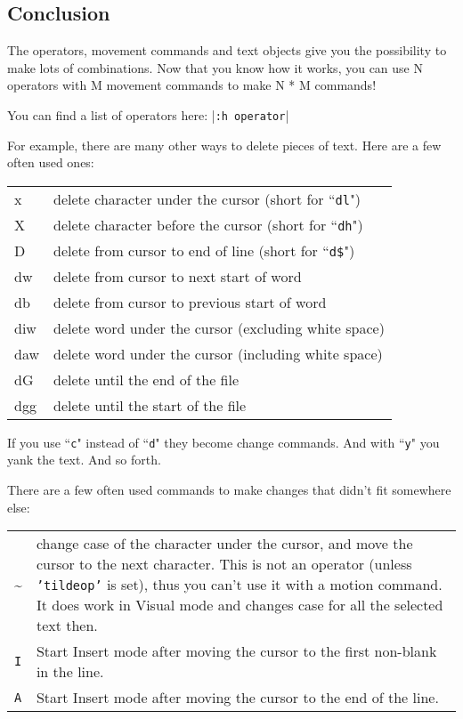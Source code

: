 \subsection{Conclusion}

The operators, movement commands and text objects give you the possibility to make lots of combinations.
Now that you know how it works, you can use N operators with M movement commands to make N * M commands!

You can find a list of operators here: |\texttt{:h operator}|

For example, there are many other ways to delete pieces of text.
Here are a few often used ones:

\begin{longtable}{l l}
				x & delete character under the cursor (short for ``\texttt{dl}") \\
				X & delete character before the cursor (short for ``\texttt{dh}") \\
				D & delete from cursor to end of line (short for ``\texttt{d\$}") \\
				dw & delete from cursor to next start of word \\
				db & delete from cursor to previous start of word \\
				diw & delete word under the cursor (excluding white space) \\
				daw & delete word under the cursor (including white space) \\
				dG & delete until the end of the file \\
				dgg & delete until the start of the file \\
\end{longtable}

If you use ``\texttt{c}" instead of ``\texttt{d}" they become change commands.
And with ``\texttt{y}" you yank the text.
And so forth.

There are a few often used commands to make changes that didn't fit somewhere else:

\begin{tabularx}{\textwidth}{l X}
				\textasciitilde & 
				change case of the character under the cursor, and move the cursor to the next character.
				This is not an operator (unless \texttt{'tildeop'} is set), thus you can't use it with a motion command.
				It does work in Visual mode and changes case for all the selected text then. \\

				\texttt{I} &
				Start Insert mode after moving the cursor to the first non-blank in the line.\\

				\texttt{A} & 
				Start Insert mode after moving the cursor to the end of the line.
\end{tabularx}
\clearpage
